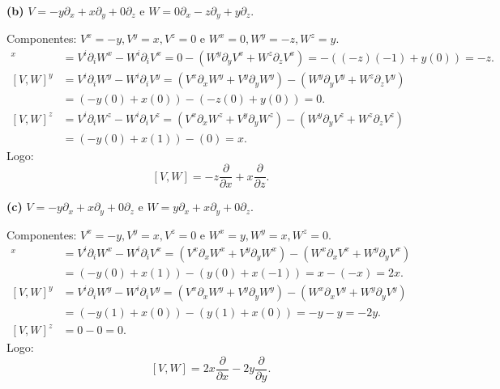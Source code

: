 {	\textbf{(b)} $V = -y \partial_x + x \partial_y + 0 \partial_z$ e $W = 0 \partial_x - z \partial_y + y \partial_z$.
	
	Componentes: $V^x = -y, V^y = x, V^z = 0$ e $W^x = 0, W^y = -z, W^z = y$.
	\begin{align*}
		[V, W]^x &= V^i \partial_i W^x - W^i \partial_i V^x = 0 - (W^y \partial_y V^x + W^z \partial_z V^x) = -((-z)(-1) + y(0)) = -z. \\
		[V, W]^y &= V^i \partial_i W^y - W^i \partial_i V^y = (V^x \partial_x W^y + V^y \partial_y W^y) - (W^y \partial_y V^y + W^z \partial_z V^y) \\
		&= (-y(0) + x(0)) - (-z(0) + y(0)) = 0. \\
		[V, W]^z &= V^i \partial_i W^z - W^i \partial_i V^z = (V^x \partial_x W^z + V^y \partial_y W^z) - (W^y \partial_y V^z + W^z \partial_z V^z) \\
		&= (-y(0) + x(1)) - (0) = x.
	\end{align*}
	Logo: $$\boxed{[V, W] = -z \frac{\partial}{\partial x} + x \frac{\partial}{\partial z}.}$$
	
	\textbf{(c)} $V = -y \partial_x + x \partial_y + 0 \partial_z$ e $W = y \partial_x + x \partial_y + 0 \partial_z$.
	
	Componentes: $V^x = -y, V^y = x, V^z = 0$ e $W^x = y, W^y = x, W^z = 0$.
	\begin{align*}
		[V, W]^x &= V^i \partial_i W^x - W^i \partial_i V^x = (V^x \partial_x W^x + V^y \partial_y W^x) - (W^x \partial_x V^x + W^y \partial_y V^x) \\
		&= (-y(0) + x(1)) - (y(0) + x(-1)) = x - (-x) = 2x. \\
		[V, W]^y &= V^i \partial_i W^y - W^i \partial_i V^y = (V^x \partial_x W^y + V^y \partial_y W^y) - (W^x \partial_x V^y + W^y \partial_y V^y) \\
		&= (-y(1) + x(0)) - (y(1) + x(0)) = -y - y = -2y. \\
		[V, W]^z &= 0 - 0 = 0.
	\end{align*}
	Logo: $$\boxed{[V, W] = 2x \frac{\partial}{\partial x} - 2y \frac{\partial}{\partial y}.}$$
}